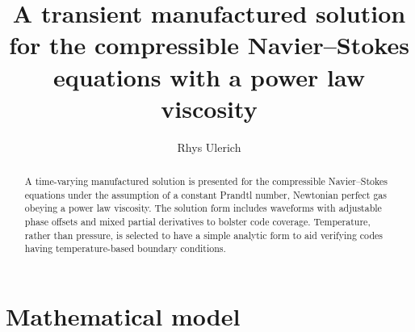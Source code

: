 \documentclass[10pt,reqno]{amsart}
\begin{document}
\title{
    A transient manufactured solution for the compressible Navier--Stokes
    equations with a power law viscosity
}
\author{Rhys Ulerich}

\begin{abstract}
A time-varying manufactured solution is presented for the compressible
Navier--Stokes equations under the assumption of a constant Prandtl number,
Newtonian perfect gas obeying a power law viscosity.  The solution form
includes waveforms with adjustable phase offsets and mixed partial derivatives
to bolster code coverage.  Temperature, rather than pressure, is selected to
have a simple analytic form to aid verifying codes having temperature-based
boundary conditions.
\end{abstract}

\maketitle

\section{Mathematical model}
\end{document}
